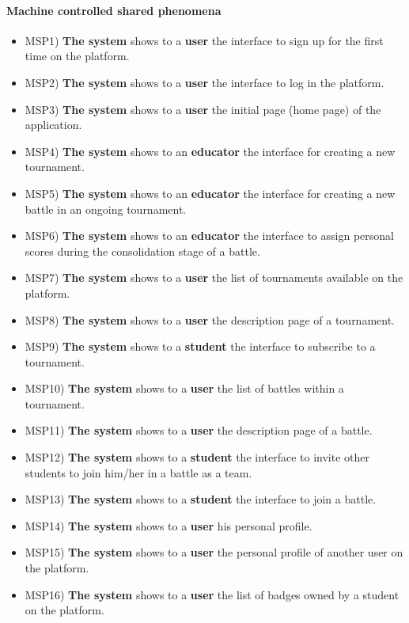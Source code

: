 	\paragraph{Machine controlled shared phenomena}
	\begin{itemize}
		\item MSP1) \textbf{The system} shows to a \textbf{user} the interface to sign up for the first time on the platform.
		\item MSP2) \textbf{The system} shows to a \textbf{user} the interface to log in the platform.
		\item MSP3) \textbf{The system} shows to a \textbf{user} the initial page (home page) of the application.
		\item MSP4) \textbf{The system} shows to an \textbf{educator} the interface for creating a new tournament.
		\item MSP5) \textbf{The system} shows to an \textbf{educator} the interface for creating a new battle in an ongoing tournament.
		\item MSP6) \textbf{The system} shows to an \textbf{educator} the interface to assign personal scores during the consolidation stage of a battle.
		\item MSP7) \textbf{The system} shows to a \textbf{user} the list of tournaments available on the platform.
		\item MSP8) \textbf{The system} shows to a \textbf{user} the description page of a tournament.
		\item MSP9) \textbf{The system} shows to a \textbf{student} the interface to subscribe to a tournament.
		\item MSP10) \textbf{The system} shows to a \textbf{user} the list of battles within a tournament.
		\item MSP11) \textbf{The system} shows to a \textbf{user} the description page of a battle.
		\item MSP12) \textbf{The system} shows to a \textbf{student} the interface to invite other students to join him/her in a battle as a team.
		\item MSP13) \textbf{The system} shows to a \textbf{student} the interface to join a battle.
		\item MSP14) \textbf{The system} shows to a \textbf{user} his personal profile.
		\item MSP15) \textbf{The system} shows to a \textbf{user} the personal profile of another user on the platform.
		\item MSP16) \textbf{The system} shows to a \textbf{user} the list of badges owned by a student on the platform.

\end{itemize}

